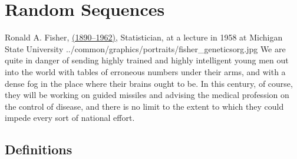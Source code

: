 \chapter{Random Sequences}
\label{app:random_processes}
\qboxnpq
  {
    Ronald A. Fisher, 
    \href{http://www-history.mcs.st-andrews.ac.uk/Timelines/TimelineG.html}{(1890--1962)}, 
    Statistician,
    at a lecture in 1958 at Michigan State University
    \footnotemark
  }
  {../common/graphics/portraits/fisher_geneticsorg.jpg}
  {We are quite in danger of sending highly trained and highly intelligent 
  young men out into the world with tables of erroneous numbers under their arms, 
  and with a dense fog in the place where their brains ought to be. 
  In this century, of course, they will be working on guided missiles and advising the 
  medical profession on the control of disease, 
  and there is no limit to the extent to which they could impede every sort of national effort.}

\section{Definitions}
\begin{definition}
\label{def:randseq}
\end{definition}

